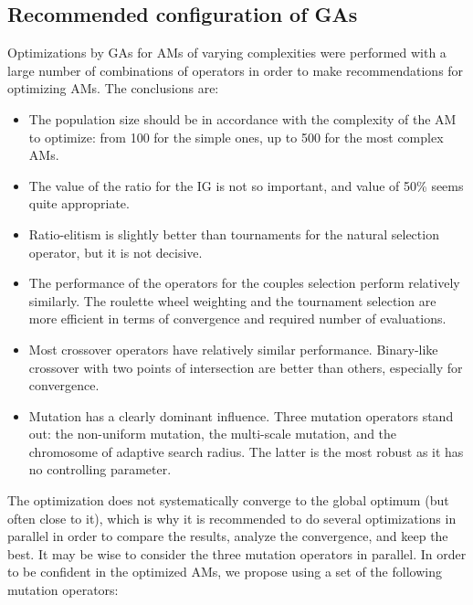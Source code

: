 \documentclass{ametsoc}
\begin{document}
\subsection{Recommended configuration of GAs}
\label{sec:recommendations}

Optimizations by GAs for AMs of varying complexities were performed with a large number of combinations of operators in order to make recommendations for optimizing AMs. The conclusions are:

\begin{itemize}
	\item The population size should be in accordance with the complexity of the AM to optimize: from 100 for the simple ones, up to 500 for the most complex AMs.
	
	\item The value of the ratio for the IG is not so important, and value of 50\% seems quite appropriate.
	
	\item Ratio-elitism is slightly better than tournaments for the natural selection operator, but it is not decisive.
	
	\item The performance of the operators for the couples selection perform relatively similarly. The roulette wheel weighting and the tournament selection are more efficient in terms of convergence and required number of evaluations.
	
	\item Most crossover operators have relatively similar performance. Binary-like crossover with two points of intersection are better than others, especially for convergence.
	
	\item Mutation has a clearly dominant influence. Three mutation operators stand out: the non-uniform mutation, the multi-scale mutation, and the chromosome of adaptive search radius. The latter is the most robust as it has no controlling parameter.
	
\end{itemize}

The optimization does not systematically converge to the global optimum (but often close to it), which is why it is recommended to do several optimizations in parallel in order to compare the results, analyze the convergence, and keep the best. It may be wise to consider the three mutation operators in parallel. In order to be confident in the optimized AMs, we propose using a set of the following mutation operators:
\end{document}
